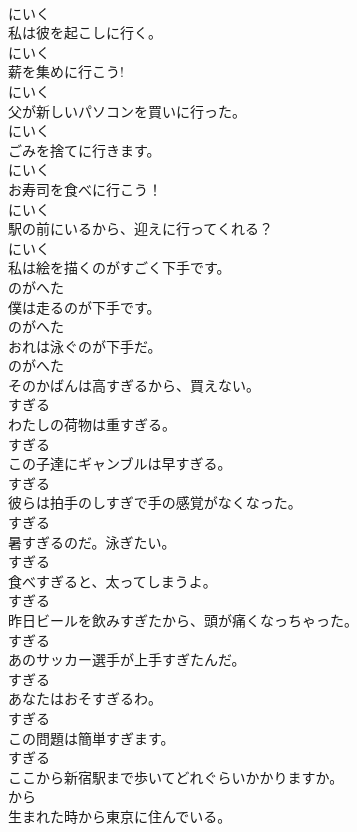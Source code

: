 \documentclass[8pt]{extreport}
\begin{document}
\begin{CJK}{UTF8}{min}
\\	にいく
\\	私は彼を起こしに行く。	
\\	にいく
\\	薪を集めに行こう!	
\\	にいく
\\	父が新しいパソコンを買いに行った。	
\\	にいく
\\	ごみを捨てに行きます。	
\\	にいく
\\	お寿司を食べに行こう！	
\\	にいく
\\	駅の前にいるから、迎えに行ってくれる？	
\\	にいく
\\	私は絵を描くのがすごく下手です。	
\\	のがへた
\\	僕は走るのが下手です。	
\\	のがへた
\\	おれは泳ぐのが下手だ。	
\\	のがへた
\\	そのかばんは高すぎるから、買えない。	
\\	すぎる
\\	わたしの荷物は重すぎる。	
\\	すぎる
\\	この子達にギャンブルは早すぎる。	
\\	すぎる
\\	彼らは拍手のしすぎで手の感覚がなくなった。	
\\	すぎる
\\	暑すぎるのだ。泳ぎたい。	
\\	すぎる
\\	食べすぎると、太ってしまうよ。	
\\	すぎる
\\	昨日ビールを飲みすぎたから、頭が痛くなっちゃった。	
\\	すぎる
\\	あのサッカー選手が上手すぎたんだ。	
\\	すぎる
\\	あなたはおそすぎるわ。	
\\	すぎる
\\	この問題は簡単すぎます。	
\\	すぎる
\\	ここから新宿駅まで歩いてどれぐらいかかりますか。	
\\	から
\\	生まれた時から東京に住んでいる。	

\end{CJK}
\end{document}
